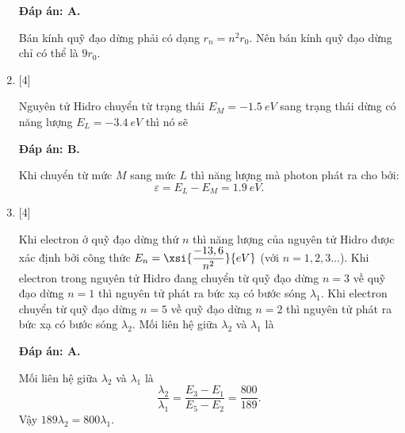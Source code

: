 \begin{enumerate}[label=\bfseries Câu \arabic*:]
	\loigiai
	{		\textbf{Đáp án: A.}
		
		Bán kính quỹ đạo dừng phải có dạng $ r_{n} = n^{2} r_{0} $. Nên bán kính quỹ đạo dừng chỉ có thể là $ 9 r_{0} $. 
	}
	
	\item {} [4]
	\cauhoi
	{Nguyên tử Hidro chuyển từ trạng thái $ E_{M} = \SI{-1,5}{eV} $ sang trạng thái dừng có năng lượng $ E_{L} = \SI{-3,4}{eV} $ thì nó sẽ
	}
	
	\loigiai
	{		\textbf{Đáp án: B.}
		
		Khi chuyển từ mức $ M $ sang mức $ L $ thì năng lượng mà photon phát ra cho bởi:
		$$
		\varepsilon = E_{L} - E_{M} = \SI{1,9}{eV}.
		$$
	}
	
	\item {} [4]
	\cauhoi
	{Khi electron ở quỹ đạo dừng thứ $ n $ thì năng lượng của nguyên tử Hidro được xác định bởi công thức $ E_{n} = \xsi{\dfrac{-13,6}{n^{2}}}{eV} $ (với $ n= 1,2,3... $). Khi electron trong nguyên tử Hidro đang chuyển từ quỹ đạo dừng $ n = 3 $ về quỹ đạo dừng $ n = 1 $ thì nguyên tử phát ra bức xạ có bước sóng $ \lambda_{1} $. Khi electron chuyển từ quỹ đạo dừng $ n = 5 $ về quỹ đạo dừng $ n = 2 $ thì nguyên tử phát ra bức xạ có bước sóng $ \lambda_{2} $. Mối liên hệ giữa $ \lambda_{2} $ và $ \lambda_{1} $ là
	}
	
	\loigiai
	{		\textbf{Đáp án: A.}
		
		Mối liên hệ giữa $ \lambda_{2} $ và $ \lambda_{1} $ là
		$$
		\dfrac{\lambda_{2}}{\lambda_{1}} = \dfrac{E_{3} - E_{1}}{E_{5} - E_{2}} = \dfrac{800}{189}.
		$$
		Vậy $ 189 \lambda_{2} = 800 \lambda_{1} $.
	}
	

\end{enumerate}

